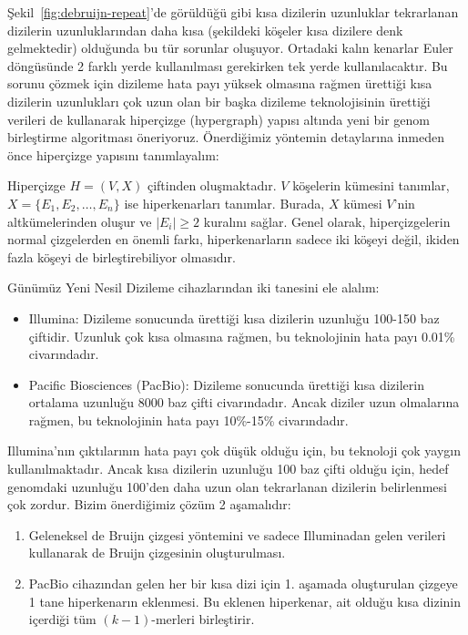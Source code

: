 	Şekil~\ref{fig:debruijn-repeat}'de görüldüğü gibi kısa dizilerin uzunluklar tekrarlanan dizilerin uzunluklarından daha kısa (şekildeki köşeler kısa dizilere denk gelmektedir) olduğunda bu tür sorunlar oluşuyor. Ortadaki kalın kenarlar Euler döngüsünde 2 farklı yerde kullanılması gerekirken tek yerde kullanılacaktır. Bu sorunu çözmek için dizileme hata payı yüksek olmasına rağmen ürettiği kısa dizilerin uzunlukları çok uzun olan bir başka dizileme teknolojisinin ürettiği verileri de kullanarak hiperçizge (hypergraph) yapısı altında  yeni bir genom birleştirme algoritması öneriyoruz. Önerdiğimiz yöntemin detaylarına inmeden önce hiperçizge yapısını tanımlayalım:
	
	Hiperçizge $H = (V, X)$ çiftinden oluşmaktadır. $V$ köşelerin kümesini tanımlar, $X = \{E_1, E_2, \ldots, E_n\}$ ise hiperkenarları tanımlar. Burada, $X$ kümesi $V$'nin altkümelerinden oluşur ve $|E_i| \geq 2$ kuralını sağlar. Genel olarak, hiperçizgelerin normal çizgelerden en önemli farkı, hiperkenarların sadece iki köşeyi değil, ikiden fazla köşeyi de birleştirebiliyor olmasıdır.

	Günümüz Yeni Nesil Dizileme cihazlarından iki tanesini ele alalım:

\begin{itemize}
\item Illumina: Dizileme sonucunda ürettiği kısa dizilerin uzunluğu 100-150 baz çiftidir. Uzunluk çok kısa olmasına rağmen, bu teknolojinin hata payı 0.01\% civarındadır.
\item Pacific Biosciences (PacBio): Dizileme sonucunda ürettiği kısa dizilerin ortalama uzunluğu 8000 baz çifti civarındadır. Ancak diziler uzun olmalarına rağmen, bu teknolojinin hata payı 10\%-15\% civarındadır.
\end{itemize}

	Illumina'nın çıktılarının hata payı çok düşük olduğu için, bu teknoloji çok yaygın kullanılmaktadır. Ancak kısa dizilerin uzunluğu 100 baz çifti olduğu için, hedef genomdaki uzunluğu 100'den daha uzun olan tekrarlanan dizilerin belirlenmesi çok zordur. Bizim önerdiğimiz çözüm 2 aşamalıdır:

\begin{enumerate}
\item Geleneksel de Bruijn çizgesi yöntemini ve sadece Illuminadan gelen verileri kullanarak de Bruijn çizgesinin oluşturulması.
\item PacBio cihazından gelen her bir kısa dizi için 1. aşamada oluşturulan çizgeye 1 tane hiperkenarın eklenmesi. Bu eklenen hiperkenar, ait olduğu kısa dizinin içerdiği tüm $(k-1)$-merleri birleştirir. 
\end{enumerate}

